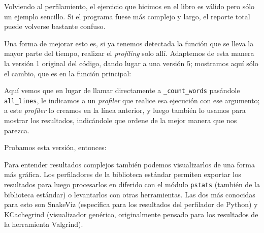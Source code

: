 Volviendo al perfilamiento, el ejercicio que hicimos en el libro es válido pero sólo un ejemplo sencillo. Si el programa fuese más complejo y largo, el reporte total puede volverse bastante confuso.

Una forma de mejorar esto es, si ya tenemos detectada la función que se lleva la mayor parte del tiempo, realizar el \textit{profiling} solo allí. Adaptemos de esta manera la versión 1 original del código, dando lugar a una versión 5; mostramos aquí sólo el cambio, que es en la función principal:


Aquí vemos que en lugar de llamar directamente a \texttt{\_count\_words} pasándole \texttt{all\_lines}, le indicamos a un \textit{profiler} que realice esa ejecución con ese argumento; a este \textit{profiler} lo creamos en la línea anterior, y luego también lo usamos para mostrar los resultados, indicándole que ordene de la mejor manera que nos parezca.

Probamos esta versión, entonces:


Para entender resultados complejos también podemos visualizarlos de una forma más gráfica. Los perfiladores de la biblioteca estándar permiten exportar los resultados para luego procesarlos en diferido con el módulo \texttt{pstats} (también de la biblioteca estándar) o levantarlos con otras herramientas. Las dos más conocidas para esto son SnakeViz (específica para los resultados del perfilador de Python) y KCachegrind (visualizador genérico, originalmente pensado para los resultados de la herramienta Valgrind).

